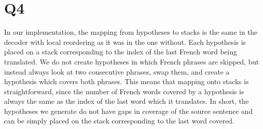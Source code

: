\section*{Q4}

In our implementation, the mapping from hypotheses to stacks is the same in
the decoder with local reordering as it was in the one without. Each
hypothesis is placed on a stack corresponding to the index of the last French
word being translated. We do not create hypotheses in which French phrases
are skipped, but instead always look at two consecutive phrases, swap them,
and create a hypothesis which covers both phrases. This means that mapping
onto stacks is straightforward, since the number of French words covered by
a hypothesis is always the same as the index of the last word which it
translates. In short, the hypotheses we generate do not have gaps
in coverage of the source sentence and can be simply placed on the stack
corresponding to the last word covered.
